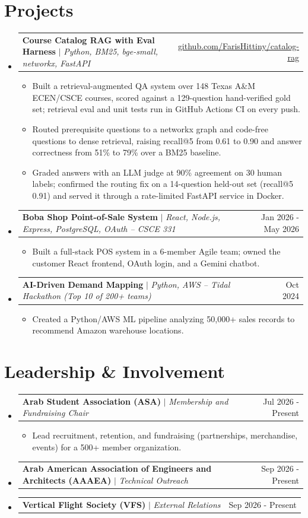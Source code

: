 \documentclass[letterpaper,11pt]{article}
\makeatletter
\newcommand{\resumeItem}[1]{\item\small{{#1 \vspace{-2pt}}}}
\newcommand{\resumeProjectHeading}[2]{
    \item
    \begin{tabular*}{0.97\textwidth}{l@{\extracolsep{\fill}}r}
      \small#1 & #2 \\
    \end{tabular*}\vspace{-7pt}
}
\newcommand{\resumeSubHeadingListStart}{\begin{itemize}[leftmargin=0.15in, label={}]}
\newcommand{\resumeSubHeadingListEnd}{\end{itemize}}
\newcommand{\resumeItemListStart}{\begin{itemize}}
\newcommand{\resumeItemListEnd}{\end{itemize}\vspace{-5pt}}
\makeatother
\begin{document}
\section{Projects}
    \resumeSubHeadingListStart
      \resumeProjectHeading
          {\textbf{Course Catalog RAG with Eval Harness} $|$ \emph{Python, BM25, bge-small, networkx, FastAPI}}{\href{https://github.com/FarisHittiny/catalog-rag}{\underline{github.com/FarisHittiny/catalog-rag}}}
          \resumeItemListStart
            \resumeItem{Built a retrieval-augmented QA system over 148 Texas A\&M ECEN/CSCE courses, scored against a 129-question hand-verified gold set; retrieval eval and unit tests run in GitHub Actions CI on every push.}
            \resumeItem{Routed prerequisite questions to a networkx graph and code-free questions to dense retrieval, raising recall@5 from 0.61 to 0.90 and answer correctness from 51\% to 79\% over a BM25 baseline.}
            \resumeItem{Graded answers with an LLM judge at 90\% agreement on 30 human labels; confirmed the routing fix on a 14-question held-out set (recall@5 0.91) and served it through a rate-limited FastAPI service in Docker.}
          \resumeItemListEnd
      \resumeProjectHeading
          {\textbf{Boba Shop Point-of-Sale System} $|$ \emph{React, Node.js, Express, PostgreSQL, OAuth -- CSCE 331}}{Jan 2026 - May 2026}
          \resumeItemListStart
            \resumeItem{Built a full-stack POS system in a 6-member Agile team; owned the customer React frontend, OAuth login, and a Gemini chatbot.}
          \resumeItemListEnd
      \resumeProjectHeading
          {\textbf{AI-Driven Demand Mapping} $|$ \emph{Python, AWS -- Tidal Hackathon (Top 10 of 200+ teams)}}{Oct 2024}
          \resumeItemListStart
            \resumeItem{Created a Python/AWS ML pipeline analyzing 50,000+ sales records to recommend Amazon warehouse locations.}
          \resumeItemListEnd
    \resumeSubHeadingListEnd

\section{Leadership \& Involvement}
  \resumeSubHeadingListStart
      \resumeProjectHeading
          {\textbf{Arab Student Association (ASA)} $|$ \emph{Membership and Fundraising Chair}}{Jul 2026 - Present}
          \resumeItemListStart
            \resumeItem{Lead recruitment, retention, and fundraising (partnerships, merchandise, events) for a 500+ member organization.}
          \resumeItemListEnd
      \resumeProjectHeading
          {\textbf{Arab American Association of Engineers and Architects (AAAEA)} $|$ \emph{Technical Outreach}}{Sep 2026 - Present}
      \vspace{4pt}
      \resumeProjectHeading
          {\textbf{Vertical Flight Society (VFS)} $|$ \emph{External Relations}}{Sep 2026 - Present}
  \resumeSubHeadingListEnd
\end{document}
